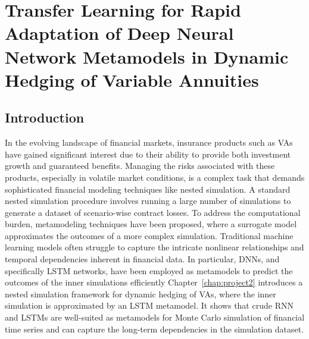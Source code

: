 \chapter{Transfer Learning for Rapid Adaptation of Deep Neural Network Metamodels in Dynamic Hedging of Variable Annuities} \label{chap:project3}

\section{Introduction}

In the evolving landscape of financial markets, insurance products such as VAs have gained significant interest due to their ability to provide both investment growth and guaranteed benefits. 
Managing the risks associated with these products, especially in volatile market conditions, is a complex task that demands sophisticated financial modeling techniques like nested simulation.
A standard nested simulation procedure involves running a large number of simulations to generate a dataset of scenario-wise contract losses.
To address the computational burden, metamodeling techniques have been proposed, where a surrogate model approximates the outcomes of a more complex simulation. 
Traditional machine learning models often struggle to capture the intricate nonlinear relationships and temporal dependencies inherent in financial data.
In particular, DNNs, and specifically LSTM networks, have been employed as metamodels to predict the outcomes of the inner simulations efficiently
Chapter~\ref{chap:project2} introduces a nested simulation framework for dynamic hedging of VAs, where the inner simulation is approximated by an LSTM metamodel.
It shows that crude RNN and LSTMs are well-suited as metamodels for Monte Carlo simulation of financial time series and can capture the long-term dependencies in the simulation dataset.

